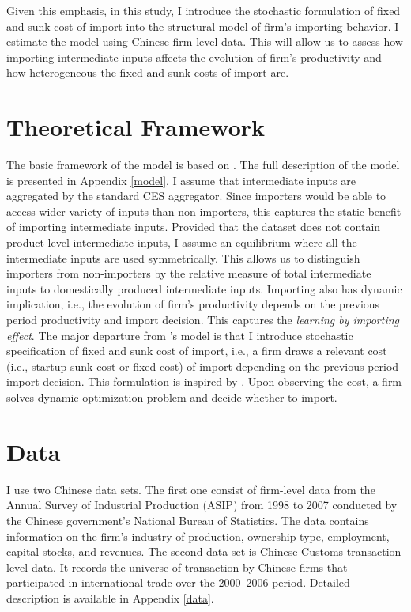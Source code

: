 \documentclass[11pt,letter]{article}
\newcounter{lem}[section] \setcounter{lem}{0}
\begin{document}
Given this emphasis, in this study, I introduce the stochastic formulation of fixed and sunk cost of import into the structural model of firm's importing behavior. I estimate the model using Chinese firm level data. This will allow us to assess how importing intermediate inputs affects the evolution of firm's productivity and how heterogeneous the fixed and sunk costs of import are.


\section{Theoretical Framework}

The basic framework of the model is based on \citet{Kasahara2008}. The full description of the model is presented in Appendix \ref{model}. I assume that intermediate inputs are aggregated by the standard CES aggregator. Since importers would be able to access wider variety of inputs than non-importers, this captures the static benefit of importing intermediate inputs. Provided that the dataset does not contain product-level intermediate inputs, I assume an equilibrium where all the intermediate inputs are used symmetrically. This allows us to distinguish importers from non-importers by the relative measure of total intermediate inputs to domestically produced intermediate inputs. Importing also has dynamic implication, i.e., the evolution of firm's productivity depends on the previous period productivity and import decision. This captures the \textit{learning by importing effect}. The major departure from \citeauthor{Kasahara2008}'s model is that I introduce stochastic specification of fixed and sunk cost of import, i.e., a firm draws a relevant cost (i.e., startup sunk cost or fixed cost) of import depending on the previous period import decision. This formulation is inspired by \citet{Bai2017}. Upon observing the cost, a firm solves dynamic optimization problem and decide whether to import.

\section{Data}

I use two Chinese data sets. The first one consist of firm-level data from the Annual Survey of Industrial Production (ASIP) from 1998 to 2007 conducted by the Chinese government's National Bureau of Statistics. The data contains information on the firm's industry of production, ownership type, employment, capital stocks, and revenues. The second data set is Chinese Customs transaction-level data. It records the universe of transaction by Chinese firms that participated in international trade over the 2000--2006 period. Detailed description is available in Appendix \ref{data}.
\end{document}
